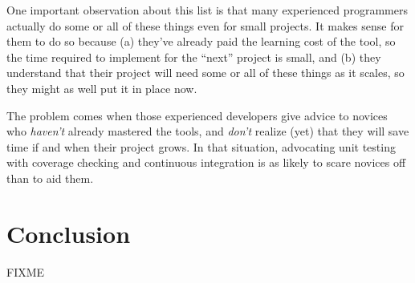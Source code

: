 \documentclass[10pt]{article}
\begin{document}
One important observation about this list is that many experienced
programmers actually do some or all of these things even for small
projects. It makes sense for them to do so because (a) they've already
paid the learning cost of the tool, so the time required to implement
for the ``next'' project is small, and (b) they understand that their
project will need some or all of these things as it scales, so they
might as well put it in place now.

The problem comes when those experienced developers give advice to
novices who \emph{haven't} already mastered the tools, and \emph{don't}
realize (yet) that they will save time if and when their project grows.
In that situation, advocating unit testing with coverage checking and
continuous integration is as likely to scare novices off than to aid
them.

\section{Conclusion}\label{conclusion}

FIXME
\end{document}
